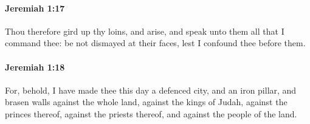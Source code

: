 		\paragraph{Jeremiah 1:17} %
			\label{JEREMIAH-1-17}

			Thou therefore gird up thy loins, and arise, and speak unto them all that I command thee: be not dismayed at their faces, lest I confound thee before them.


		\paragraph{Jeremiah 1:18} %
			\label{JEREMIAH-1-18}

			For, behold, I have made thee this day a defenced city, and an iron pillar, and brasen walls against the whole land, against the kings of Judah, against the princes thereof, against the priests thereof, and against the people of the land.

